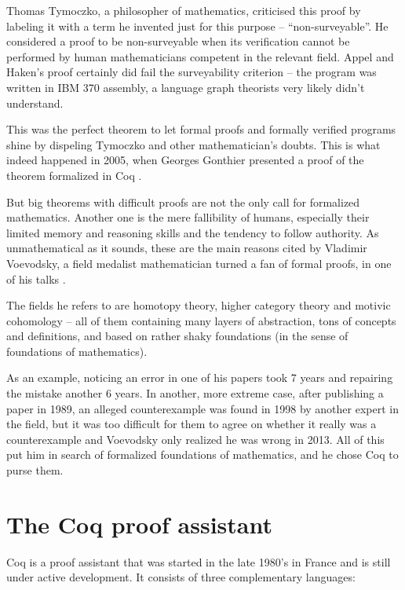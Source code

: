 \documentclass[declaration,inz,english,shortabstract]{iithesis}
\begin{document}
Thomas Tymoczko, a philosopher of mathematics, criticised this proof by labeling it with a term he invented just for this purpose -- ``non-surveyable''. He considered a proof to be non-surveyable when its verification cannot be performed by human mathematicians competent in the relevant field. Appel and Haken's proof certainly did fail the surveyability criterion -- the program was written in IBM 370 assembly, a language graph theorists very likely didn't understand.

This was the perfect theorem to let formal proofs and formally verified programs shine by dispeling Tymoczko and other mathematician's doubts. This is what indeed happened in 2005, when Georges Gonthier presented a proof of the theorem formalized in Coq \cite{FourColour1} \cite{FourColour2}.

But big theorems with difficult proofs are not the only call for formalized mathematics. Another one is the mere fallibility of humans, especially their limited memory and reasoning skills and the tendency to follow authority. As unmathematical as it sounds, these are the main reasons cited by Vladimir Voevodsky, a field medalist mathematician turned a fan of formal proofs, in one of his talks \cite{UnivalentFoundations}.

The fields he refers to are homotopy theory, higher category theory and motivic cohomology -- all of them containing many layers of abstraction, tons of concepts and definitions, and based on rather shaky foundations (in the sense of foundations of mathematics).

As an example, noticing an error in one of his papers took 7 years and repairing the mistake another 6 years. In another, more extreme case, after publishing a paper in 1989, an alleged counterexample was found in 1998 by another expert in the field, but it was too difficult for them to agree on whether it really was a counterexample and Voevodsky only realized he was wrong in 2013. All of this put him in search of formalized foundations of mathematics, and he chose Coq to purse them. 

\section{The Coq proof assistant}

Coq \cite{Coq} is a proof assistant that was started in the late 1980's in France and is still under active development. It consists of three complementary languages:
\end{document}
